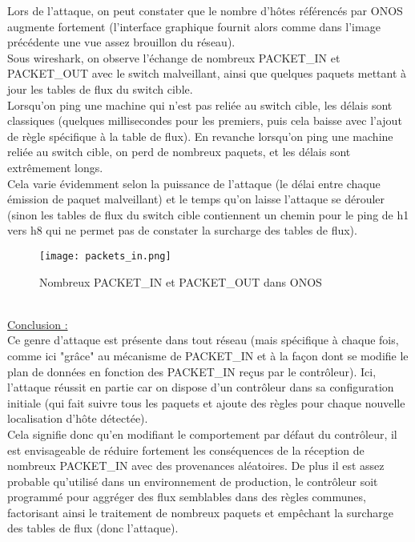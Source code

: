 Lors de l'attaque, on peut constater que le nombre d'hôtes référencés par ONOS augmente fortement (l'interface graphique fournit alors comme dans l'image précédente une vue assez brouillon du réseau).\\
Sous wireshark, on observe l'échange de nombreux PACKET\_IN et PACKET\_OUT avec le switch malveillant, ainsi que quelques paquets mettant à jour les tables de flux du switch cible.\\
Lorsqu'on ping une machine qui n'est pas reliée au switch cible, les délais sont classiques (quelques millisecondes pour les premiers, puis cela baisse avec l'ajout de règle spécifique à la table de flux). En revanche lorsqu'on ping une machine reliée au switch cible, on perd de nombreux paquets, et les délais sont extrêmement longs.\\
Cela varie évidemment selon la puissance de l'attaque (le délai entre chaque émission de paquet malveillant) et le temps qu'on laisse l'attaque se dérouler (sinon les tables de flux du switch cible contiennent un chemin pour le ping de h1 vers h8 qui ne permet pas de constater la surcharge des tables de flux).

\begin{figure}[h]
  	\centering
  	\texttt{[image: packets\_in.png]}
  	\caption{Nombreux PACKET\_IN et PACKET\_OUT dans ONOS}
\end{figure}
~\\
\underline{Conclusion :}\\
Ce genre d'attaque est présente dans tout réseau (mais spécifique à chaque fois, comme ici "grâce" au mécanisme de PACKET\_IN et à la façon dont se modifie le plan de données en fonction des PACKET\_IN reçus par le contrôleur). Ici, l'attaque réussit en partie car on dispose d'un contrôleur dans sa configuration initiale (qui fait suivre tous les paquets et ajoute des règles pour chaque nouvelle localisation d'hôte détectée).\\
Cela signifie donc qu'en modifiant le comportement par défaut du contrôleur, il est envisageable de réduire fortement les conséquences de la réception de nombreux PACKET\_IN avec des provenances aléatoires. De plus il est assez probable qu'utilisé dans un environnement de production, le contrôleur soit programmé pour aggréger des flux semblables dans des règles communes, factorisant ainsi le traitement de nombreux paquets et empêchant la surcharge des tables de flux (donc l'attaque).
